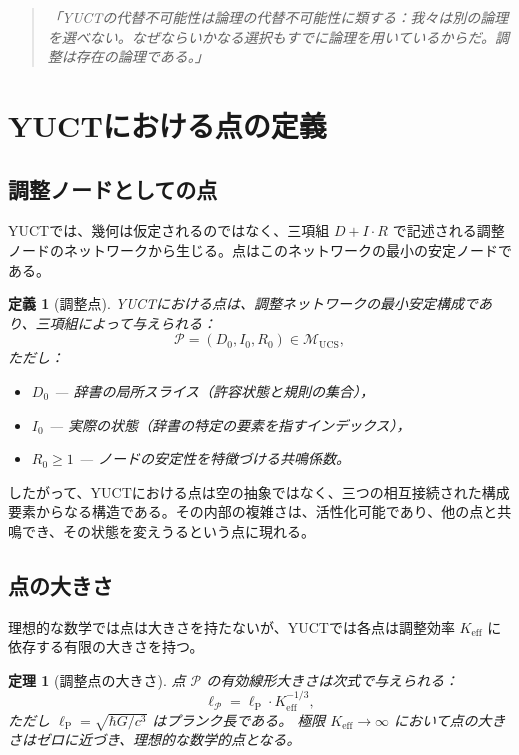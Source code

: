 \documentclass[12pt,a4paper]{article}
\newtheorem{theorem}{定理}
\newtheorem{definition}{定義}
\newcommand{\Keff}{K_{\mathrm{eff}}}
\newcommand{\calP}{\mathcal{P}}
\newcommand{\ellP}{\ell_{\mathrm{P}}}
\begin{document}
	\begin{quote}
		\itshape
		「YUCTの代替不可能性は論理の代替不可能性に類する：我々は別の論理を選べない。なぜならいかなる選択もすでに論理を用いているからだ。調整は存在の論理である。」
	\end{quote}
	
	\section{YUCTにおける点の定義}
	
	\subsection{調整ノードとしての点}
	
	YUCTでは、幾何は仮定されるのではなく、三項組 \(D+I\cdot R\) で記述される調整ノードのネットワークから生じる。点はこのネットワークの最小の安定ノードである。
	
	\begin{definition}[調整点]
		YUCTにおける点は、調整ネットワークの最小安定構成であり、三項組によって与えられる：
		\[
		\calP = (D_0, I_0, R_0) \in \mathcal{M}_{\mathrm{UCS}},
		\]
		ただし：
		\begin{itemize}
			\item \(D_0\) — 辞書の局所スライス（許容状態と規則の集合），
			\item \(I_0\) — 実際の状態（辞書の特定の要素を指すインデックス），
			\item \(R_0 \ge 1\) — ノードの安定性を特徴づける共鳴係数。
		\end{itemize}
	\end{definition}
	
	したがって、YUCTにおける点は空の抽象ではなく、三つの相互接続された構成要素からなる構造である。その内部の複雑さは、活性化可能であり、他の点と共鳴でき、その状態を変えうるという点に現れる。
	
	\subsection{点の大きさ}
	
	理想的な数学では点は大きさを持たないが、YUCTでは各点は調整効率 \(\Keff\) に依存する有限の大きさを持つ。
	
	\begin{theorem}[調整点の大きさ]
		点 \(\calP\) の有効線形大きさは次式で与えられる：
		\[
		\ell_{\calP} = \ellP \cdot \Keff^{-1/3},
		\]
		ただし \(\ellP = \sqrt{\hbar G / c^3}\) はプランク長である。
		極限 \(\Keff \to \infty\) において点の大きさはゼロに近づき、理想的な数学的点となる。
	\end{theorem}
	
\end{document}
